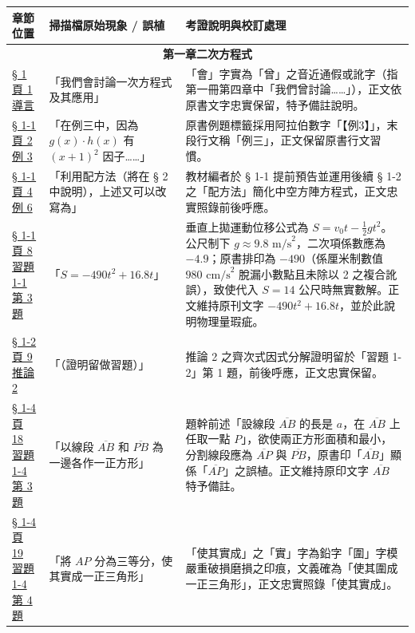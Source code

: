 \documentclass[a4paper,12pt,twoside]{article}
\begin{document}
\begin{table}[H]
\centering
\small
\renewcommand{\arraystretch}{1.35}
\begin{tabularx}{\textwidth}{|p{3.0cm}|p{3.8cm}|X|}
\hline
\textbf{章節位置} & \textbf{掃描檔原始現象 / 誤植} & \textbf{考證說明與校訂處理} \\ \hline

\multicolumn{3}{|c|}{\textbf{第一章\quad 二次方程式}} \\ \hline

\hyperref[note:b2-ch1-intro-ceng]{§ 1 頁 1 導言} & 
「我們會討論一次方程式及其應用」 & 
「會」字實為「曾」之音近通假或訛字（指第一冊第四章中「我們曾討論……」），正文依原書文字忠實保留，特予備註說明。 \\ \hline

\hyperref[note:b2-ch1-ex3]{§ 1-1 頁 2 例 3} & 
「在例三中，因為 $g(x)\cdot h(x)$ 有 $(x+1)^2$ 因子……」 & 
原書例題標籤採用阿拉伯數字「【例3】」，末段行文稱「例三」，正文保留原書行文習慣。 \\ \hline

\hyperref[note:b2-ch1-ex6]{§ 1-1 頁 4 例 6} & 
「利用配方法（將在 § 2 中說明），上述又可以改寫為」 & 
教材編者於 § 1-1 提前預告並運用後續 § 1-2 之「配方法」簡化中空方陣方程式，正文忠實照錄前後呼應。 \\ \hline

\hyperref[note:b2-ch1-gravity]{§ 1-1 頁 8 習題 1-1 第 3 題} & 
「$S = -490t^2 + 16.8t$」 & 
垂直上拋運動位移公式為 $S = v_0 t - \frac{1}{2}gt^2$。公尺制下 $g \approx 9.8\text{ m/s}^2$，二次項係數應為 $-4.9$；原書排印為 $-490$（係厘米制數值 $980\text{ cm/s}^2$ 脫漏小數點且未除以 2 之複合訛誤），致使代入 $S=14$ 公尺時無實數解。正文維持原刊文字 $-490t^2+16.8t$，並於此說明物理量瑕疵。 \\ \hline

\hyperref[note:b2-ch1-cor2]{§ 1-2 頁 9 推論 2} & 
「（證明留做習題）」 & 
推論 2 之齊次式因式分解證明留於「習題 1-2」第 1 題，前後呼應，正文忠實保留。 \\ \hline

\hyperref[note:b2-ch1-ex1-4-q3]{§ 1-4 頁 18 習題 1-4 第 3 題} & 
「以線段 $\overline{AB}$ 和 $\overline{PB}$ 為一邊各作一正方形」 & 
題幹前述「設線段 $\overline{AB}$ 的長是 $a$，在 $\overline{AB}$ 上任取一點 $P$」，欲使兩正方形面積和最小，分割線段應為 $\overline{AP}$ 與 $\overline{PB}$，原書印「$\overline{AB}$」顯係「$\overline{AP}$」之誤植。正文維持原印文字 $\overline{AB}$ 特予備註。 \\ \hline

\hyperref[note:b2-ch1-ex1-4-q4]{§ 1-4 頁 19 習題 1-4 第 4 題} & 
「將 $AP$ 分為三等分，使其實成一正三角形」 & 
「使其實成」之「實」字為鉛字「圍」字模嚴重破損磨損之印痕，文義確為「使其圍成一正三角形」，正文忠實照錄「使其實成」。 \\ \hline


\end{tabularx}
\end{table}
\end{document}
